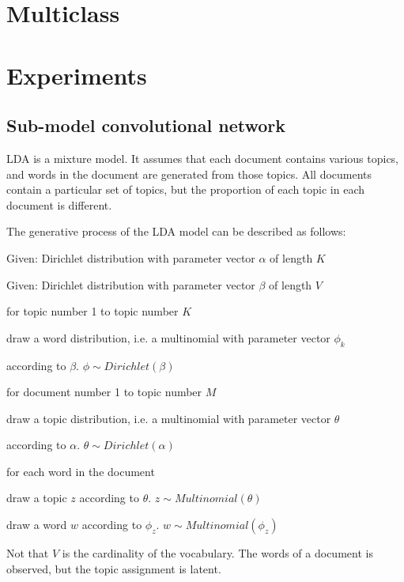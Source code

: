 \documentclass{article} %
\begin{document}
\section{Multiclass}


\section{Experiments}
\subsection{Sub-model convolutional network}


LDA is a mixture model. It assumes that each document contains various topics, and words in the document are generated from those topics. All documents contain a particular set of topics, but the proportion of each topic in each document is different. 

\par
The generative process of the LDA model can be described as follows:
\par
\setlength{\parindent}{3em}
Given: Dirichlet distribution with parameter vector $\alpha$ of length $K$
\par
Given: Dirichlet distribution with parameter vector $\beta$ of length $V$
\par
for topic number 1 to topic number $K$
\par
\setlength{\parindent}{4em}
draw a word distribution, i.e. a multinomial with parameter vector $\phi _{k}$\par according to $\beta$. $\phi \sim Dirichlet(\beta)$
\par
\setlength{\parindent}{3em}
for document number 1 to topic number $M$
\par
\setlength{\parindent}{4em}
draw a topic distribution, i.e. a multinomial with parameter vector $\theta$ 
\par
according to $\alpha$. $\theta \sim Dirichlet(\alpha)$
\par
for each word in the document
\par
\setlength{\parindent}{5em}
draw a topic $z$ according to $\theta$.  $z \sim Multinomial(\theta)$
\par
draw a word $w$ according to $\phi_{z}$.  $w \sim Multinomial(\phi_{z})$
\setlength{\parindent}{0pt}
\par
Not that $V$ is the cardinality of the vocabulary. The words of a document is observed, but the topic assignment is latent.
\end{document}
